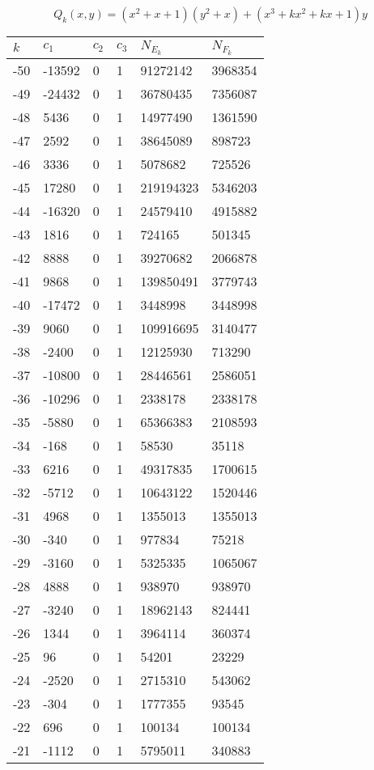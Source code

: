 \documentclass{amsart}
\begin{document}
$$Q_k(x,y)=(x^2 + x + 1)(y^2+x) + (x^3 + kx^2 + kx + 1)y$$
\begin{longtable}{llllll}
\hline
$k$ & $c_1$ & $c_2$ & $c_3$ & $N_{E_k}$ & $N_{F_k}$\\
\hline
-50 & -13592 & 0 & 1 & 91272142 & 3968354\\
-49 & -24432 & 0 & 1 & 36780435 & 7356087\\
-48 & 5436 & 0 & 1 & 14977490 & 1361590\\
-47 & 2592 & 0 & 1 & 38645089 & 898723\\
-46 & 3336 & 0 & 1 & 5078682 & 725526\\
-45 & 17280 & 0 & 1 & 219194323 & 5346203\\
-44 & -16320 & 0 & 1 & 24579410 & 4915882\\
-43 & 1816 & 0 & 1 & 724165 & 501345\\
-42 & 8888 & 0 & 1 & 39270682 & 2066878\\
-41 & 9868 & 0 & 1 & 139850491 & 3779743\\
-40 & -17472 & 0 & 1 & 3448998 & 3448998\\
-39 & 9060 & 0 & 1 & 109916695 & 3140477\\
-38 & -2400 & 0 & 1 & 12125930 & 713290\\
-37 & -10800 & 0 & 1 & 28446561 & 2586051\\
-36 & -10296 & 0 & 1 & 2338178 & 2338178\\
-35 & -5880 & 0 & 1 & 65366383 & 2108593\\
-34 & -168 & 0 & 1 & 58530 & 35118\\
-33 & 6216 & 0 & 1 & 49317835 & 1700615\\
-32 & -5712 & 0 & 1 & 10643122 & 1520446\\
-31 & 4968 & 0 & 1 & 1355013 & 1355013\\
-30 & -340 & 0 & 1 & 977834 & 75218\\
-29 & -3160 & 0 & 1 & 5325335 & 1065067\\
-28 & 4888 & 0 & 1 & 938970 & 938970\\
-27 & -3240 & 0 & 1 & 18962143 & 824441\\
-26 & 1344 & 0 & 1 & 3964114 & 360374\\
-25 & 96 & 0 & 1 & 54201 & 23229\\
-24 & -2520 & 0 & 1 & 2715310 & 543062\\
-23 & -304 & 0 & 1 & 1777355 & 93545\\
-22 & 696 & 0 & 1 & 100134 & 100134\\
-21 & -1112 & 0 & 1 & 5795011 & 340883\\

\end{longtable}
\end{document}
